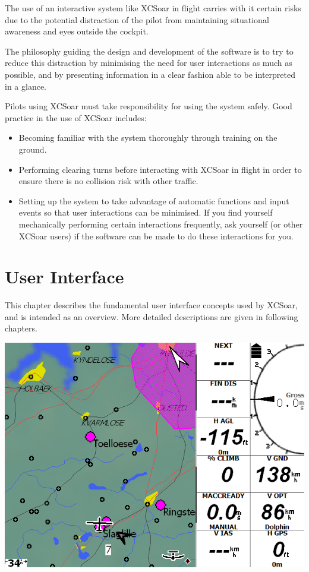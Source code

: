 \documentclass[a4paper,12pt]{refrep}
\begin{document}
The use of an interactive system like XCSoar in flight carries with it
certain risks due to the potential distraction of the pilot from
maintaining situational awareness and eyes outside the cockpit.

The philosophy guiding the design and development of the software is
to try to reduce this distraction by minimising the need for user
interactions as much as possible, and by presenting information in a
clear fashion able to be interpreted in a glance.

Pilots using XCSoar must take responsibility for using the system safely.
Good practice in the use of XCSoar includes:
\begin{itemize}
\item Becoming familiar with the system thoroughly through training on 
  the ground.
\item Performing clearing turns before interacting with XCSoar in flight
  in order to ensure there is no collision risk with other traffic.
\item Setting up the system to take advantage of automatic functions
  and input events so that user interactions can be minimised.  If you
  find yourself mechanically performing certain interactions frequently,
  ask yourself (or other XCSoar users) if the software can be made to do 
  these interactions for you.
\end{itemize}

\chapter{User Interface}\label{cha:interface}
This chapter describes the fundamental user interface concepts used by
XCSoar, and is intended as an overview.  More detailed descriptions
are given in following chapters.

\begin{center}
\includegraphics[angle=0,width=\linewidth,keepaspectratio='true']{figures/plain.png}
\end{center}
\end{document}
